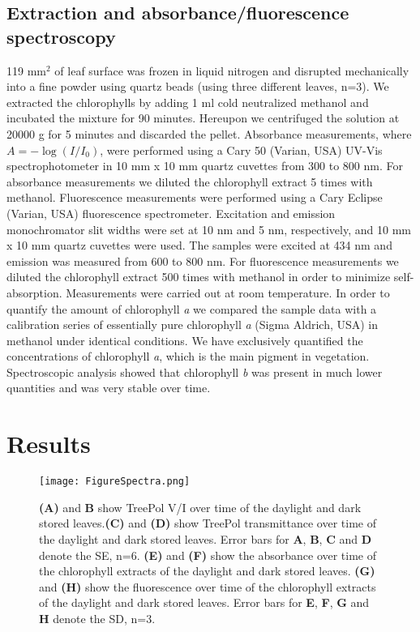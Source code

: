 \documentclass[review]{elsarticle}
\begin{document}
\subsection{Extraction and absorbance/fluorescence spectroscopy}
119 mm$^{2}$ of leaf surface was frozen in liquid nitrogen and disrupted mechanically into a fine powder using quartz beads (using three different leaves, n=3). We extracted the chlorophylls by adding 1 ml cold neutralized methanol and incubated the mixture for 90 minutes. Hereupon we centrifuged the solution at 20000 g for 5 minutes and discarded the pellet. 
Absorbance measurements, where $A=-\log(I/I_{0})$, were performed using a Cary 50 (Varian, USA) UV-Vis spectrophotometer in 10 mm x 10 mm quartz cuvettes from 300 to 800 nm. For absorbance measurements we diluted the chlorophyll extract 5 times with methanol. Fluorescence measurements were performed using a Cary Eclipse (Varian, USA) fluorescence spectrometer. Excitation and emission monochromator slit widths were set at 10 nm and 5 nm, respectively, and 10 mm x 10 mm quartz cuvettes were used. The samples were excited at 434 nm and emission was measured from 600 to 800 nm. For fluorescence measurements we diluted the chlorophyll extract 500 times with methanol in order to minimize self-absorption. Measurements were carried out at room temperature. In order to quantify the amount of chlorophyll \textit{a} we compared the sample data with a calibration series of essentially pure chlorophyll \textit{a} (Sigma Aldrich, USA) in methanol under identical conditions. We have exclusively quantified the concentrations of chlorophyll \textit{a}, which is the main pigment in vegetation. Spectroscopic analysis showed that chlorophyll \textit{b} was present in much lower quantities and was very stable over time.

\section{Results}

\begin{figure*}[]
  \centering
  \texttt{[image: FigureSpectra.png]}
  \caption{\textbf{(A)} and \textbf{B} show TreePol V/I over time of the daylight and dark stored leaves.\textbf{(C)} and \textbf{(D)} show TreePol transmittance over time of the daylight and dark stored leaves. Error bars for \textbf{A}, \textbf{B}, \textbf{C} and \textbf{D} denote the SE, n=6. \textbf{(E)} and \textbf{(F)} show the absorbance over time of the chlorophyll extracts of the daylight and dark stored leaves. \textbf{(G)} and \textbf{(H)} show the fluorescence over time of the chlorophyll extracts of the daylight and dark stored leaves. Error bars for \textbf{E}, \textbf{F}, \textbf{G} and \textbf{H} denote the SD, n=3.}
  \label{fig:Spec}
\end{figure*}
\end{document}
